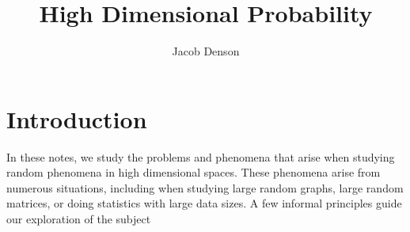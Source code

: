 

\title{High Dimensional Probability}
\author{Jacob Denson}



\maketitle
\tableofcontents
{}

\chapter{Introduction}

In these notes, we study the problems and phenomena that arise when studying random phenomena in high dimensional spaces. These phenomena arise from numerous situations, including when studying large random graphs, large random matrices, or doing statistics with large data sizes. A few informal principles guide our exploration of the subject
%
